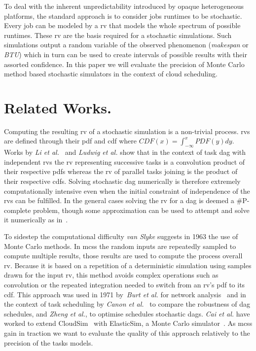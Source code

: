 \documentclass[10pt,conference,compsocconf]{IEEEtran}
\newcommand{\etal}[1]{\emph{#1 et al.}}
\begin{document}
To deal  with the inherent  unpredictability introduced by  opaque heterogeneous
platforms, the standard approach is to  consider jobs runtimes to be stochastic.
Every job can be modeled by a \ac{rv} that models the whole spectrum of possible
runtimes. These  \ac{rv} are  the basis required  for a  stochastic simulations.
Such  simulations   output  a  random   variable  of  the   observed  phenomenon
(\emph{makespan}  or  \emph{\ac{BTU}}) which  in  turn  can  be used  to  create
intervals of possible  results with their assorted confidence. In  this paper we
will evaluate the precision of Monte Carlo method based stochastic simulators in
the context of cloud scheduling.

\section{Related Works.}

Computing the resulting \ac{rv} of a stochastic simulation is a non-trivial
process.  \acp{rv} are defined through their \ac{pdf} and \ac{cdf} where $CDF(x)
= \int_{-\infty}^{x} PDF(y) dy$. Works by \etal{Li}~\cite{Li97} and
\etal{Ludwig}\cite{Ludwig01} show that in the context of task \ac{dag} with
independent \acp{rv} the \ac{rv} representing successive tasks is a convolution
product of their respective \acp{pdf} whereas the \ac{rv} of parallel tasks
joining is the product of their respective \acp{cdf}. Solving stochastic
\ac{dag} numerically is therefore extremely computationally intensive even when
the initial constraint of independence of the \acp{rv} can be fulfilled. In the
general cases solving the \ac{rv} for a \ac{dag} is deemed a \#P-complete
problem, though some approximation can be used to attempt and solve it
numerically as in~\cite{dodin85}.

To sidestep the computational difficulty \emph{van Slyke} suggests in
1963\cite{Slyke63} the use of Monte Carlo methods. In \acp{mcs} the random
inputs are repeatedly sampled to compute multiple results, those results are
used to compute the process overall \acl{rv}. Because it is based on a
repetition of a deterministic simulation using samples drawn for the input
\ac{rv}, this method avoids complex operations such as convolution or the
repeated integration needed to switch from an \ac{rv}'s \ac{pdf} to its
\ac{cdf}. This approach was used in 1971 by~\etal{Burt} for network
analysis~\cite{burt71} and in the context of task scheduling by
\etal{Canon}~\cite{Canon10} to compare the robustness of \ac{dag} schedules, and
\etal{Zheng}, to optimise schedules stochastic \acp{dag}. \etal{Cai} have worked
to extend CloudSim~\cite{cloudsim} with ElasticSim, a Monte Carlo
simulator~\cite{cai16}. As \acp{mcs} gain in traction we want to
evaluate the quality of this approach relatively to the precision of the tasks
models.
\end{document}
